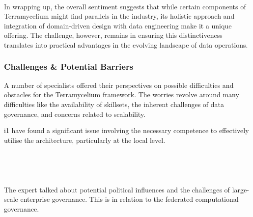 \documentclass{ieeeaccess}
\begin{document}
\,

In wrapping up, the overall sentiment suggests that while certain components of Terramycelium might find parallels in the industry, its holistic approach and integration of domain-driven design with data engineering make it a unique offering. The challenge, however, remains in ensuring this distinctiveness translates into practical advantages in the evolving landscape of data operations.

\subsubsection{Challenges \& Potential Barriers}

A number of specialists offered their perspectives on possible difficulties and obstacles for the Terramycelium framework. The worries revolve around many difficulties like the availability of skillsets, the inherent challenges of data governance, and concerns related to scalability.

i1 have found a significant issue involving the necessary competence to effectively utilise the architecture, particularly at the local level.

\,

\setlength{\fboxsep}{0.3em}

\noindent{}

\,

The expert talked about potential political influences and the challenges of large-scale enterprise governance. This is in relation to the federated computational governance.

\,

\setlength{\fboxsep}{0.3em}

\noindent{}
\end{document}
